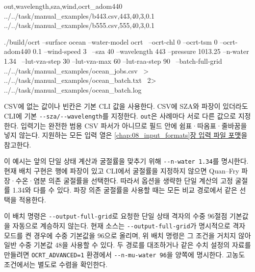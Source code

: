 \par\noindent\begin{minipage}{\linewidth}
\begin{ManualCode}
out,wavelength,sza,wind,ocrt_adom440
../../task/manual_examples/b443.csv,443,40,3,0.1
../../task/manual_examples/b555.csv,555,40,3,0.1
\end{ManualCode}
\end{minipage}\par


\par\noindent\begin{minipage}{\linewidth}
\begin{ManualCode}
./build/ocrt --surface ocean --water-model ocrt \
  --ocrt-chl 0 --ocrt-tsm 0 --ocrt-adom440 0.1 --wind-speed 3 \
  --sza 40 --wavelength 443 --pressure 1013.25 --n-water 1.34 \
  --lut-vza-step 30 --lut-vza-max 60 --lut-raa-step 90 \
  --batch-full-grid ../../task/manual_examples/ocean_jobs.csv \
  > ../../task/manual_examples/ocean_batch.txt \
  2> ../../task/manual_examples/ocean_batch.log
\end{ManualCode}
\end{minipage}\par

CSV에 없는 값이나 빈칸은 기본 CLI 값을 사용한다. CSV에 SZA와 파장이 있더라도 CLI에 기본 \texttt{-\allowbreak{}-\allowbreak{}sza/\allowbreak{}-\allowbreak{}-\allowbreak{}wavelength}를 지정한다. \texttt{out}은 사례마다 서로 다른 값으로 지정한다. 입력기는 완전한 범용 CSV 파서가 아니므로 필드 안에 쉼표·따옴표·줄바꿈을 넣지 않는다. 지원하는 모든 입력 열은 \hyperref[chap:08_input_formats]{\ref*{chap:08_input_formats}장 입력 파일 포맷}을 참고한다.

이 예시는 앞의 단일 상태 계산과 굴절률을 맞추기 위해 \texttt{-\allowbreak{}-\allowbreak{}n-\allowbreak{}water 1.\allowbreak{}34}를 명시한다. 현재 배치 구현은 행에 파장이 있고 CLI에서 굴절률을 지정하지 않으면 Quan--Fry 파장·수온·염분 의존 굴절률을 선택한다. 따라서 옵션을 생략한 단일 계산의 고정 굴절률 1.34와 다를 수 있다. 파장 의존 굴절률을 사용할 때는 모든 비교 경로에서 같은 선택을 적용한다.

이 배치 명령은 \texttt{-\allowbreak{}-\allowbreak{}output-\allowbreak{}full-\allowbreak{}grid}로 요청한 단일 상태 격자의 수중 96절점 기본값을 자동으로 계승하지 않는다. 현재 소스는 \texttt{-\allowbreak{}-\allowbreak{}output-\allowbreak{}full-\allowbreak{}grid}가 명시적으로 격자 모드를 켠 경우에 수중 기본값을 96으로 올리며, 위 배치 명령은 그 조건을 거치지 않아 일반 수중 기본값 48을 사용할 수 있다. 두 경로를 대조하거나 같은 수치 설정의 자료를 만들려면 \texttt{OCRT\_\allowbreak{}ADVANCED=\allowbreak{}1} 환경에서 \texttt{-\allowbreak{}-\allowbreak{}n-\allowbreak{}mu-\allowbreak{}water 96}을 양쪽에 명시한다. 고농도 조건에서는 별도로 수렴을 확인한다.

